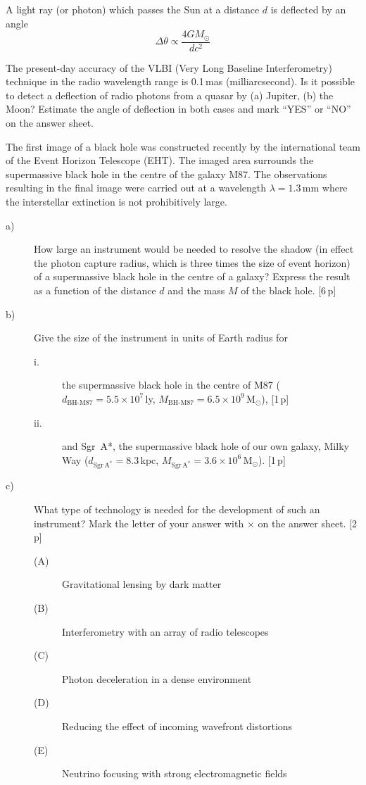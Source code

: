 A light ray (or photon) which passes the Sun at a distance $d$ is deflected by
an angle
\[ \Delta\theta \propto \frac{4GM_\odot}{d c^2} \]

The present-day accuracy of the VLBI (Very Long Baseline Interferometry)
technique in the radio wavelength range is 0.1\,mas (milliarcsecond). Is it
possible to detect a deflection of radio photons from a quasar by (a) Jupiter,
(b) the Moon? Estimate the angle of deflection in both cases and mark ``YES''
or ``NO'' on the answer sheet.

The first image of a black hole was constructed recently by the international
team of the Event Horizon Telescope (EHT). The imaged area surrounds the
supermassive black hole in the centre of the galaxy M87. The observations
resulting in the final image were carried out at a wavelength
$\lambda = 1.3$\,mm where the interstellar extinction is not prohibitively
large.

\begin{description}
\item[a)] How large an instrument would be needed to resolve the shadow (in
  effect the photon capture radius, which is three times the size of event
  horizon) of a supermassive black hole in the centre of a galaxy? Express the
  result as a function of the distance $d$ and the mass $M$ of the black hole.
  \hfill[6\,p]
\item[b)] Give the size of the instrument in units of Earth radius for
  \begin{description}
  \item[i.] the supermassive black hole in the centre of M87
    ($d_{\mathrm{BH\text{-}M87}} = 5.5 \times 10^7$\,ly,
    $M_{\mathrm{BH\text{-}M87}} = 6.5 \times 10^9\,\mathrm{M}_\odot$),
    \hfill[1\,p]
  \item[ii.] and Sgr~A*, the supermassive black hole of our own galaxy, Milky
    Way ($d_{\mathrm{Sgr\,A^*}} = 8.3$\,kpc,
    $M_{\mathrm{Sgr\,A^*}} = 3.6 \times 10^6\,\mathrm{M}_\odot$). \hfill[1\,p]
  \end{description}
\item[c)] What type of technology is needed for the development of such an
  instrument? Mark the letter of your answer with $\times$ on the answer
  sheet. \hfill[2\,p]
  \begin{description}
  \item[(A)] Gravitational lensing by dark matter
  \item[(B)] Interferometry with an array of radio telescopes
  \item[(C)] Photon deceleration in a dense environment
  \item[(D)] Reducing the effect of incoming wavefront distortions
  \item[(E)] Neutrino focusing with strong electromagnetic fields
  \end{description}
\end{description}

